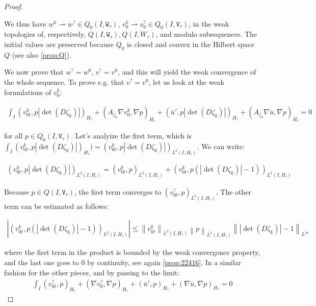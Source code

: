 \documentclass[english,a4paper,9pt,oneside]{scrbook}	%
\theoremstyle{break}
\newenvironment{mproof}[1][\proofname]{%
  \begin{proof}[#1]$ $\par\nobreak\ignorespaces
}{%
  \end{proof}
}
\renewcommand*{\proofname}{Proof}
\theoremstyle{remark}
\newcommand{\norm}[1]{\left\lVert#1\right\rVert}
\newcommand{\weakc}{\rightharpoonup}
\newcommand{\tw}[1]{\texttt{#1}}
\begin{document}
\begin{mproof}
We thus have $w^k\weakc w^? \in Q_0(I, \tw{W}_{ \tau})$, $v_0^k \weakc v_0^? \in Q_0(I,\tw{V}_{\tau})$, in the weak topologies of, respectively, $Q(I, \tw{W}_{ \tau}), Q(I,W_{\tau})$, and modulo subsequences. The initial values are preserved because $Q_0$ is closed and convex in the Hilbert space $Q$ (see also \cref{prop:Q}). 

We now prove that $w^?=w^0$, $v^?=v^0$, and this will yield the weak convergence of the whole sequence.
To prove e.g. that $v^?=v^0$, let us look at the weak formulations of $v_0^k$:

\begin{align*}
\int_I (v_{0t}^k,p |\det(D\zeta_k)|)_{H_\tau} + (A_{\zeta_k} \nabla v_0^k, \nabla p)_{H_\tau}+(\bar{u}',p|\det(D\zeta_k)|)_{H_\tau}+(A_{\zeta_k} \nabla \bar{u} , \nabla p)_{H_\tau} = 0
\end{align*}

for all $p \in Q_0(I,\tw{V}_{\tau})$.
Let's analyize the first term, which is $\int_I (v_{0t}^k,p |\det(D\zeta_k)|)_{H_\tau} ) =(v_{0t}^k,p |\det(D\zeta_k)|)_{L^2(I,H_\tau)}$.
We can write:

\begin{align*}
(v_{0t}^k,p |\det(D\zeta_k)|)_{L^2(I,H_\tau)} = (v_{0t}^k,p )_{L^2(I,H_\tau)} + (v_{0t}^k,p (|\det(D\zeta_k)|-1))_{L^2(I,H_\tau)}
\end{align*}

Because $p \in  Q(I,\tw{V}_{\tau})$, the first term converges to $(v_{0t}^?,p )_{L^2(I,H_\tau)}$. The other term can be estimated as follows:

\begin{align*}
|(v_{0t}^k,p (|\det(D\zeta_k)|-1))_{L^2(I,H_\tau)}|\leq\norm{v_{0t}^k}_{L^2(I,H_\tau)}\norm{p }_{L^2(I,H_\tau)} \norm{|\det(D\zeta_k)|-1}_{L^\infty}
\end{align*}

where the first term in the product is bounded by the weak convergence property, and the last one goes to $0$ by continuity, see again \cref{prop:22416}. 
In a similar fashion for the other pieces, and by passing to the limit:
\begin{align*}
\int_I (v_{0t}^?,p)_{H_\tau} + (\nabla v_0^?, \nabla p)_{H_\tau}+(\bar{u}',p)_{H_\tau}+(\nabla \bar{u} , \nabla p)_{H_\tau} = 0
\end{align*}


\end{mproof}
\end{document}
